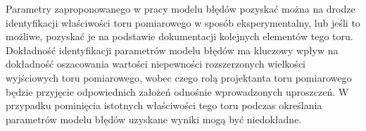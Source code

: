 Parametry zaproponowanego w pracy modelu błędów pozyskać można na drodze identyfikacji właściwości toru pomiarowego w sposób eksperymentalny, lub jeśli to możliwe, pozyskać je na podstawie dokumentacji kolejnych elementów tego toru. Dokładność identyfikacji parametrów modelu błędów ma kluczowy wpływ na dokładność oszacowania wartości niepewności rozszerzonych wielkości wyjściowych toru pomiarowego, wobec czego rolą projektanta toru pomiarowego będzie przyjęcie odpowiednich założeń odnośnie wprowadzonych uproszczeń. W przypadku pominięcia istotnych właściwości tego toru podczas określania parametrów modelu błędów uzyskane wyniki mogą być niedokładne.
